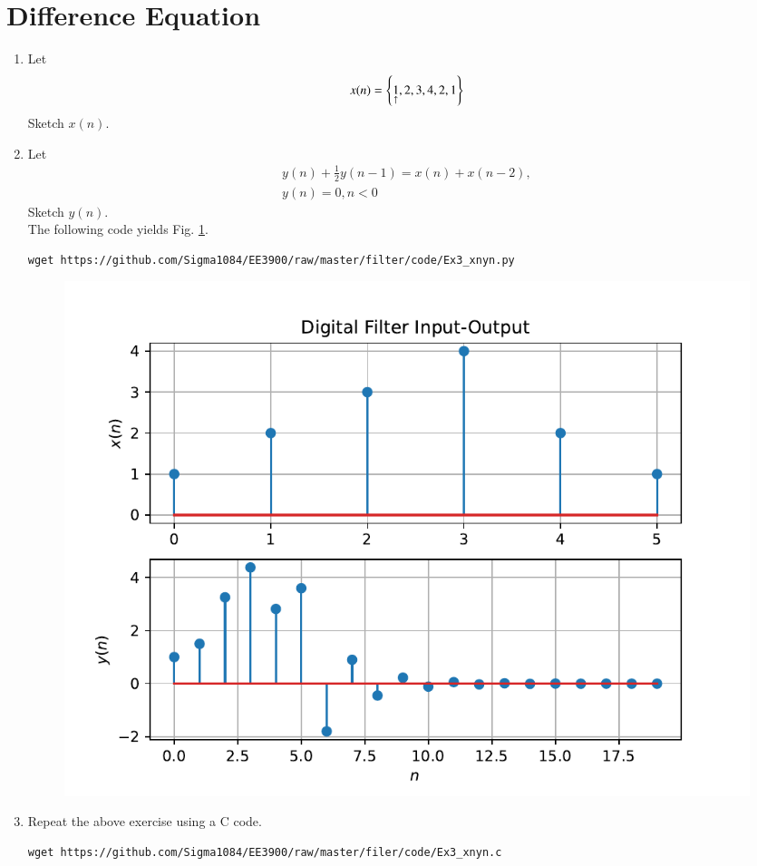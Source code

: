 \documentclass[journal,12pt,twocolumn]{IEEEtran}
\renewcommand\thesection{\arabic{section}}
\begin{document}
\section{Difference Equation}
\begin{enumerate}[label=\thesection.\arabic*,ref=\thesection.\theenumi]
\item Let
    \label{def:xn}
\begin{equation}
x(n) = \left\{\underset{\uparrow}{1},2,3,4,2,1\right\}
\end{equation}
Sketch $x(n)$.
\item Let
\begin{multline}
\label{eq:iir_filter}
y(n) + \frac{1}{2}y(n-1) = x(n) + x(n-2), 
\\
 y(n) = 0, n < 0
\end{multline}
Sketch $y(n)$.
\\
\solution The following code yields Fig. \ref{fig:xnyn}.
\begin{lstlisting}
wget https://github.com/Sigma1084/EE3900/raw/master/filter/code/Ex3_xnyn.py
\end{lstlisting}
\begin{figure}[!ht]
\begin{center}
\includegraphics[width=\columnwidth]{./figs/xnyn}
\end{center}
\label{fig:xnyn}	
\end{figure}

\item Repeat the above exercise using a C code.
\solution
\begin{lstlisting}
wget https://github.com/Sigma1084/EE3900/raw/master/filer/code/Ex3_xnyn.c
\end{lstlisting}

\end{enumerate}
\end{document}
